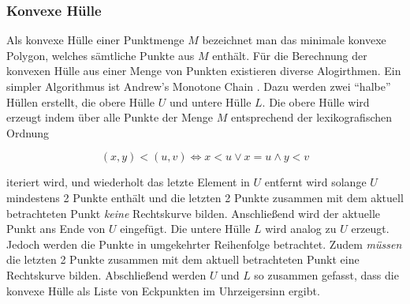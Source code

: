 \subsubsection*{Konvexe Hülle}

Als konvexe Hülle einer Punktmenge $M$ bezeichnet man das minimale konvexe
Polygon, welches sämtliche Punkte aus $M$ enthält.
Für die Berechnung der konvexen Hülle aus einer Menge von Punkten existieren
diverse Alogirthmen.
Ein simpler Algorithmus ist Andrew's Monotone Chain \cite{compgeom2008}.
Dazu werden zwei "`halbe"' Hüllen erstellt, die obere Hülle $U$ und untere Hülle
$L$.
Die obere Hülle wird erzeugt indem über alle Punkte der Menge $M$ entsprechend
der lexikografischen Ordnung

  \[ (x,y) < (u, v) \Longleftrightarrow x < u \vee x = u \wedge y < v \]

iteriert wird, und wiederholt das letzte Element in
$U$ entfernt wird solange $U$ mindestens 2 Punkte enthält und die letzten 2
Punkte zusammen mit dem aktuell betrachteten Punkt \emph{keine} Rechtskurve
bilden.
Anschließend wird der aktuelle Punkt ans Ende von $U$ eingefügt.
Die untere Hülle $L$ wird analog zu $U$ erzeugt.
Jedoch werden die Punkte in umgekehrter Reihenfolge betrachtet.
Zudem \emph{müssen} die letzten 2 Punkte zusammen mit dem aktuell betrachteten
Punkt eine Rechtskurve bilden. Abschließend werden $U$ und $L$ so zusammen
gefasst, dass die konvexe Hülle als Liste von Eckpunkten im Uhrzeigersinn
ergibt.
